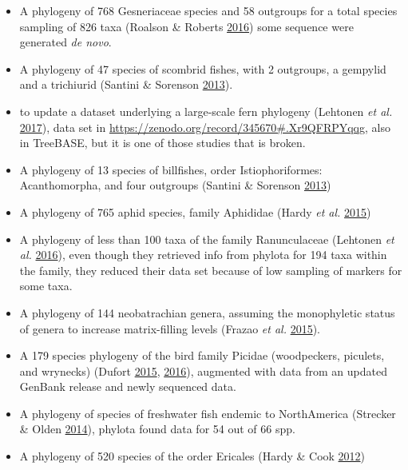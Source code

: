 \documentclass[]{article}
\providecommand{\tightlist}{%
  \setlength{\itemsep}{0pt}\setlength{\parskip}{0pt}}
\begin{document}
\begin{enumerate}
  \begin{itemize}
  \tightlist
  \item
    A phylogeny of 768 Gesneriaceae species and 58 outgroups for a total species
    sampling of 826 taxa (Roalson \& Roberts \protect\hyperlink{ref-roalson2016distinct}{2016}) some sequence were generated \emph{de novo}.
  \item
    A phylogeny of 47 species of scombrid fishes, with 2 outgroups, a gempylid and
    a trichiurid (Santini \& Sorenson \protect\hyperlink{ref-santini2013first}{2013}).
  \item
    to update a dataset underlying a large-scale fern phylogeny (Lehtonen \emph{et al.} \protect\hyperlink{ref-lehtonen2017environmentally}{2017}),
    data set in \url{https://zenodo.org/record/345670\#.Xr9QFRPYqqg}, also in TreeBASE,
    but it is one of those studies that is broken.
  \item
    A phylogeny of 13 species of billfishes, order Istiophoriformes: Acanthomorpha,
    and four outgroups (Santini \& Sorenson \protect\hyperlink{ref-santini2013first}{2013})
  \item
    A phylogeny of 765 aphid species, family Aphididae (Hardy \emph{et al.} \protect\hyperlink{ref-hardy2015evolution}{2015})
  \item
    A phylogeny of less than 100 taxa of the family Ranunculaceae (Lehtonen \emph{et al.} \protect\hyperlink{ref-lehtonen2016sensitive}{2016}),
    even though they retrieved info from phylota for 194 taxa within the family, they
    reduced their data set because of low sampling of markers for some taxa.
  \item
    A phylogeny of 144 neobatrachian genera, assuming the monophyletic status of
    genera to increase matrix-filling levels (Frazao \emph{et al.} \protect\hyperlink{ref-frazao2015gondwana}{2015}).
  \item
    A 179 species phylogeny of the bird family Picidae (woodpeckers, piculets,
    and wrynecks) (Dufort \protect\hyperlink{ref-dufort2015coexistence}{2015}, \protect\hyperlink{ref-dufort2016augmented}{2016}), augmented with data from an updated GenBank
    release and newly sequenced data.
  \item
    A phylogeny of species of freshwater fish endemic to NorthAmerica (Strecker \& Olden \protect\hyperlink{ref-strecker2014fish}{2014}),
    phylota found data for 54 out of 66 spp.
  \item
    A phylogeny of 520 species of the order Ericales (Hardy \& Cook \protect\hyperlink{ref-hardy2012testing}{2012})

\end{itemize}
\end{enumerate}
\end{document}

